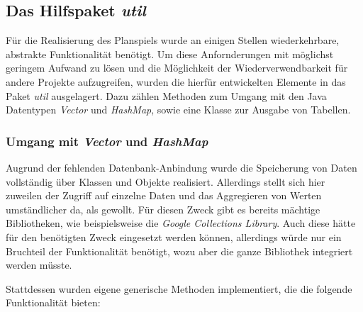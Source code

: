 \subsection{Das Hilfspaket \textit{util}}
\label{sub:fachkonzept-implementierung-util}


Für die Realisierung des Planspiels wurde an einigen Stellen wiederkehrbare, abstrakte Funktionalität benötigt. Um diese Anfornderungen mit möglichst geringem Aufwand zu lösen und die Möglichkeit der Wiederverwendbarkeit für andere Projekte aufzugreifen, wurden die hierfür entwickelten Elemente in das Paket \textit{util} ausgelagert. Dazu zählen Methoden zum Umgang mit den Java Datentypen \textit{Vector} und \textit{HashMap}, sowie eine Klasse zur Ausgabe von Tabellen.

\subsubsection{Umgang mit \textit{Vector} und \textit{HashMap}}
Augrund der fehlenden Datenbank-Anbindung wurde die Speicherung von Daten vollständig über Klassen und Objekte realisiert. Allerdings stellt sich hier zuweilen der Zugriff auf einzelne Daten und das Aggregieren von Werten umständlicher da, als gewollt. Für diesen Zweck gibt es bereits mächtige Bibliotheken, wie beispielsweise die \textit{Google Collections Library}. Auch diese hätte für den benötigten Zweck eingesetzt werden können, allerdings würde nur ein Bruchteil der Funktionalität benötigt, wozu aber die ganze Bibliothek integriert werden müsste.

Stattdessen wurden eigene generische Methoden implementiert, die die folgende Funktionalität bieten:

